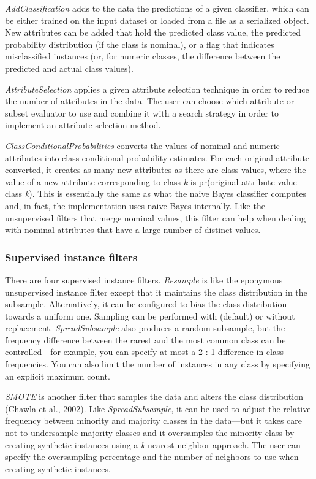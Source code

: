 \textit{AddClassification} adds to the data the predictions of a given
classifier, which can be either trained on the input dataset or loaded
from a file as a serialized object. New attributes can be added that
hold the predicted class value, the predicted probability distribution
(if the class is nominal), or a flag that indicates misclassified
instances (or, for numeric classes, the difference between the
predicted and actual class values).

\textit{AttributeSelection} applies a given attribute selection
technique in order to reduce the number of attributes in the data. The
user can choose which attribute or subset evaluator to use and combine
it with a search strategy in order to implement an attribute selection
method.

\textit{ClassConditionalProbabilities} converts the values of nominal
and numeric attributes into class conditional probability
estimates. For each original attribute converted, it creates as many
new attributes as there are class values, where the value of a new
attribute corresponding to class \textit{k} is pr(original attribute
value | class \textit{k}). This is essentially the same as what the
naive Bayes classifier computes and, in fact, the implementation uses
naive Bayes internally. Like the unsupervised filters that merge
nominal values, this filter can help when dealing with nominal
attributes that have a large number of distinct values.

\subsubsection{Supervised instance filters}

There are four supervised instance filters. \textit{Resample} is like
the eponymous unsupervised instance filter except that it maintains
the class distribution in the subsample. Alternatively, it can be
configured to bias the class distribution towards a uniform
one. Sampling can be performed with (default) or without
replacement. \textit{SpreadSubsample} also produces a random
subsample, but the frequency difference between the rarest and the
most common class can be controlled—for example, you can specify at
most a 2 : 1 difference in class frequencies. You can also limit the
number of instances in any class by specifying an explicit maximum
count.

\textit{SMOTE} is another filter that samples the data and alters the
class distribution (Chawla et al., 2002). Like
\textit{SpreadSubsample}, it can be used to adjust the relative
frequency between minority and majority classes in the data---but it
takes care not to undersample majority classes and it oversamples the
minority class by creating synthetic instances using a
\textit{k}-nearest neighbor approach. The user can specify the
oversampling percentage and the number of neighbors to use when
creating synthetic instances.

